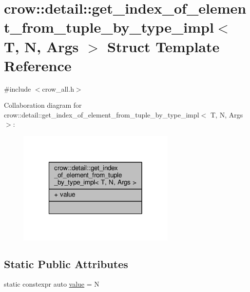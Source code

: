 \hypertarget{structcrow_1_1detail_1_1get__index__of__element__from__tuple__by__type__impl}{\section{crow\-:\-:detail\-:\-:get\-\_\-index\-\_\-of\-\_\-element\-\_\-from\-\_\-tuple\-\_\-by\-\_\-type\-\_\-impl$<$ T, N, Args $>$ Struct Template Reference}
\label{structcrow_1_1detail_1_1get__index__of__element__from__tuple__by__type__impl}
}


{\ttfamily \#include $<$crow\-\_\-all.\-h$>$}



Collaboration diagram for crow\-:\-:detail\-:\-:get\-\_\-index\-\_\-of\-\_\-element\-\_\-from\-\_\-tuple\-\_\-by\-\_\-type\-\_\-impl$<$ T, N, Args $>$\-:
\nopagebreak
\begin{figure}[H]
\begin{center}
\leavevmode
\includegraphics[width=222pt]{structcrow_1_1detail_1_1get__index__of__element__from__tuple__by__type__impl__coll__graph}
\end{center}
\end{figure}
\subsection*{Static Public Attributes}
\begin{DoxyCompactItemize}
\item 
static constexpr auto \hyperlink{structcrow_1_1detail_1_1get__index__of__element__from__tuple__by__type__impl_a5da6765892a4095a36260683d7f251b7}{value} = N
\end{DoxyCompactItemize}


